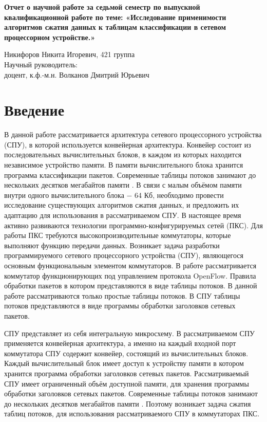 \documentclass[a4peper, 12pt, titlepage, finall]{extreport}
\begin{document}
\begin{center}
    {\large \bf Отчет о научной работе за седьмой семестр по выпускной квалификационной работе по теме:
    «Исследование применимости алгоритмов сжатия данных к таблицам классификации в сетевом процессорном устройстве.»}
\end{center}
        \begin{flushright}
            {Никифоров Никита Игоревич, 421 группа}\\
            {Научный руководитель:\\доцент, к.ф.-м.н. Волканов Дмитрий Юрьевич}
        \end{flushright}
    \section{Введение}
        В данной работе рассматривается архитектура сетевого процессорного устройства (СПУ), в которой используется конвейерная архитектура.
        Конвейер состоит из последовательных вычислительных блоков, в каждом из которых находится независимое устройство памяти.
        В памяти вычислительного блока хранится программа классификации пакетов. Современные таблицы потоков занимают
        до нескольких десятков мегабайтов памяти \cite{rottenstreich2016optimal}.
        В связи с малым объёмом памяти внутри одного вычислительного блока $-$ 64 Кб, 
        необходимо провести исследование существующих алгоритмов сжатия данных, и предложить их адаптацию для использования 
        в рассматриваемом СПУ.
        \fi
В настоящее время активно развиваются технологии программно-конфигурируемых сетей (ПКС). Для работы ПКС требуются высокопроизводительные коммутаторы, 
        которые выполняют функцию передачи данных. Возникает задача разработки программируемого сетевого процессорного устройства (СПУ),
        являющегося основным функциональным элементом коммутаторов. В работе рассматривается коммутатор функционирующих под управлением протокола OpenFlow.
        Правила обработки пакетов в котором представляются в виде таблицы потоков. В данной работе рассматриваются только простые таблицы потоков.
        В СПУ таблицы потоков представляются в виде программы обработки заголовков сетевых пакетов.


        СПУ представляет из себя интегральную микросхему. В рассматриваемом СПУ применяется конвейерная архитектура,
        а именно на каждый входной порт коммутатора СПУ содержит конвейер, состоящий из вычислительных блоков. Каждый вычислительный блок имеет доступ к 
        устройству памяти в котором хранится программа обработки заголовков сетевых пакетов. Рассматриваемый СПУ имеет ограниченный объём доступной
        памяти, для хранения программы обработки заголовков сетевых пакетов.
        Современные таблицы потоков занимают до нескольких десятков мегабайтов памяти \cite{rottenstreich2016optimal}. Поэтому возникает задача сжатия таблиц потоков,
        для использования рассматриваемого СПУ в коммутаторах ПКС.
\end{document}
